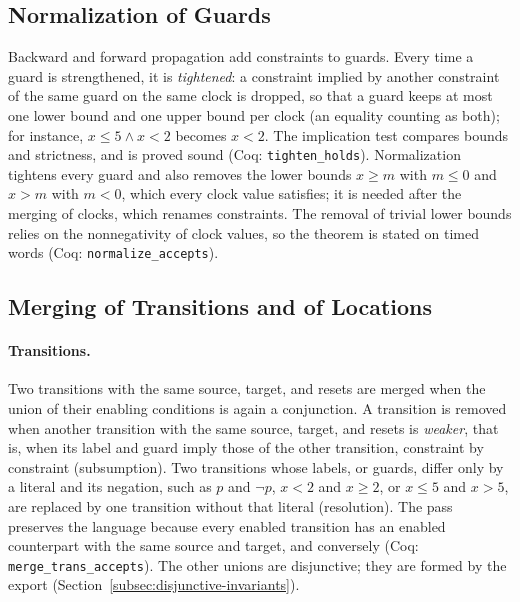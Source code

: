 \subsection{Normalization of Guards}
\label{sec:normalize}
Backward and forward propagation add constraints to guards.  Every time a
guard is strengthened, it is \emph{tightened}: a constraint implied by another
constraint of the same guard on the same clock is dropped, so that a guard
keeps at most one lower bound and one upper bound per clock (an equality
counting as both); for instance, $x\le5\land x<2$ becomes $x<2$.  The
implication test compares bounds and strictness, and is proved sound (Coq:
\texttt{tighten\_\allowbreak{}holds}).  Normalization tightens every guard and also
removes the lower bounds $x\ge m$ with $m\le0$ and $x>m$ with $m<0$, which every
clock value satisfies; it is needed after the merging of clocks, which renames
constraints.  The removal of trivial lower bounds relies on the nonnegativity
of clock values, so the theorem is stated on timed words (Coq:
\texttt{normalize\_\allowbreak{}accepts}).

\subsection{Merging of Transitions and of Locations}
\label{sec:merge-ts}
\paragraph{Transitions.}
Two transitions with the same source, target, and resets are merged when the
union of their enabling conditions is again a conjunction.  A transition is
removed when another transition with the same source, target, and resets is
\emph{weaker}, that is, when its label and guard imply those of the other
transition, constraint by constraint (subsumption).  Two transitions
whose labels, or guards, differ only by a literal and its negation, such as
$p$ and $\neg p$, $x<2$ and $x\ge2$, or $x\le5$ and $x>5$, are replaced by one
transition without that literal (resolution).  The pass preserves the language
because every enabled transition has an enabled counterpart with the same
source and target, and conversely (Coq: \texttt{merge\_\allowbreak{}trans\_\allowbreak{}accepts}).
The other unions are disjunctive; they are formed by the export
(Section~\ref{subsec:disjunctive-invariants}).


